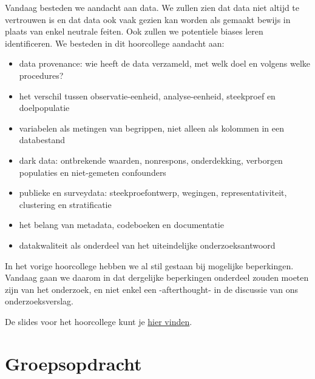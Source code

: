 \documentclass[
  letterpaper,
  DIV=11,
  numbers=noendperiod]{scrreprt}
\providecommand{\tightlist}{%
  \setlength{\itemsep}{0pt}\setlength{\parskip}{0pt}}
\begin{document}
\begin{tcolorbox}[enhanced jigsaw, arc=.35mm, bottomrule=.15mm, bottomtitle=1mm, breakable, colback=white, colbacktitle=quarto-callout-tip-color!10!white, colframe=quarto-callout-tip-color-frame, coltitle=black, left=2mm, leftrule=.75mm, opacityback=0, opacitybacktitle=0.6, rightrule=.15mm, title=\textcolor{quarto-callout-tip-color}{\faLightbulb}\hspace{0.5em}{Hoorcollege 18 juni 2026}, titlerule=0mm, toprule=.15mm, toptitle=1mm]

Vandaag besteden we aandacht aan data. We zullen zien dat data niet
altijd te vertrouwen is en dat data ook vaak gezien kan worden als
gemaakt bewijs in plaats van enkel neutrale feiten. Ook zullen we
potentiele biases leren identificeren. We besteden in dit hoorcollege
aandacht aan:

\begin{itemize}
\tightlist
\item
  data provenance: wie heeft de data verzameld, met welk doel en volgens
  welke procedures?
\item
  het verschil tussen observatie-eenheid, analyse-eenheid, steekproef en
  doelpopulatie
\item
  variabelen als metingen van begrippen, niet alleen als kolommen in een
  databestand
\item
  dark data: ontbrekende waarden, nonrespons, onderdekking, verborgen
  populaties en niet-gemeten confounders
\item
  publieke en surveydata: steekproefontwerp, wegingen,
  representativiteit, clustering en stratificatie
\item
  het belang van metadata, codeboeken en documentatie
\item
  datakwaliteit als onderdeel van het uiteindelijke onderzoeksantwoord
\end{itemize}

In het vorige hoorcollege hebben we al stil gestaan bij mogelijke
beperkingen. Vandaag gaan we daarom in dat dergelijke beperkingen
onderdeel zouden moeten zijn van het onderzoek, en niet enkel een
-afterthought- in de discussie van ons onderzoeksverslag.

De slides voor het hoorcollege kunt je \href{slides/lec-4.html}{hier
vinden}.

\end{tcolorbox}

\section{Groepsopdracht}\label{groepsopdracht-2}
\end{document}
